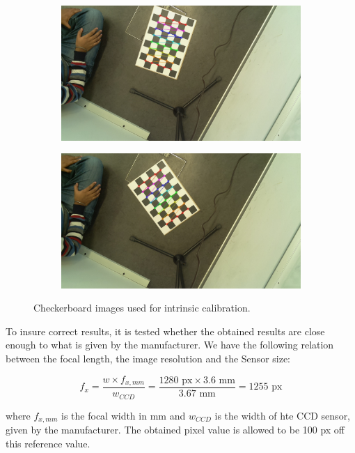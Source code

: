 \begin{figure}[H]
\begin{subfigure}{0.24\linewidth}
    \end{subfigure}
    \begin{subfigure}{0.24\linewidth}
        \includegraphics[width=\linewidth]{files/output145_7.jpg}
    \end{subfigure}
    \begin{subfigure}{0.24\linewidth}
        \includegraphics[width=\linewidth]{files/output145_8.jpg}
    \end{subfigure}
    \caption{Checkerboard images used for intrinsic calibration. }
    \label{fig:checkerboard}
\end{figure}

To insure correct results, it is tested whether the obtained results are close enough to what is given by the manufacturer. We have the following relation between the focal length, the image resolution and the Sensor size:

\begin{equation}
    f_x = \frac{w \times f_{x,mm}}{w_{CCD}} = \frac{1280\text{ px} \times 3.6\text{ mm}}{3.67\text{ mm}} = 1255 \text{ px}
\end{equation}

where $f_{x,mm}$ is the focal width in mm and $w_{CCD}$ is the width of hte CCD sensor, given by the manufacturer.
The obtained pixel value is allowed to be 100 px off this reference value.
